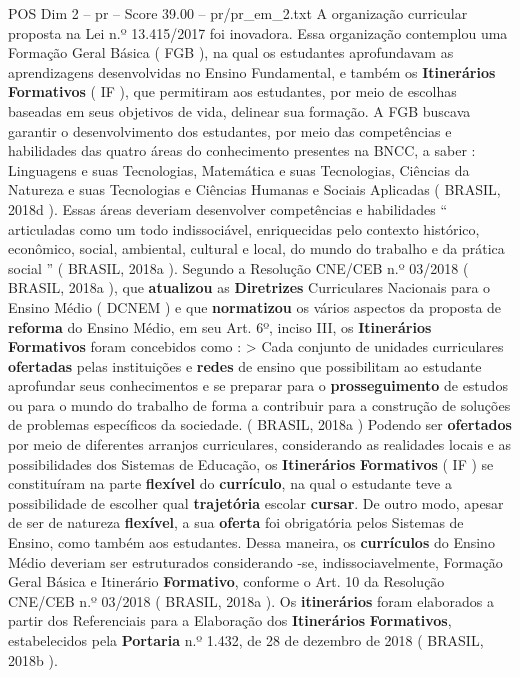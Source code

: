 \begin{textsample}{POS Dim 2 – pr – Score 39.00 – pr/pr\_em\_2.txt}
A organização curricular proposta na Lei n.º 13.415/2017 foi inovadora.
Essa organização contemplou uma Formação Geral Básica ( FGB ), na qual os estudantes aprofundavam as aprendizagens desenvolvidas no Ensino Fundamental, e também os \textbf{Itinerários} \textbf{Formativos} ( IF ), que permitiram aos estudantes, por meio de escolhas baseadas em seus objetivos de vida, delinear sua formação.
A FGB buscava garantir o desenvolvimento dos estudantes, por meio das competências e habilidades das quatro áreas do conhecimento presentes na BNCC, a saber : Linguagens e suas Tecnologias, Matemática e suas Tecnologias, Ciências da Natureza e suas Tecnologias e Ciências Humanas e Sociais Aplicadas ( BRASIL, 2018d ).
Essas áreas deveriam desenvolver competências e habilidades “ articuladas como um todo indissociável, enriquecidas pelo contexto histórico, econômico, social, ambiental, cultural e local, do mundo do trabalho e da prática social ” ( BRASIL, 2018a ).
Segundo a Resolução CNE/CEB n.º 03/2018 ( BRASIL, 2018a ), que \textbf{atualizou} as \textbf{Diretrizes} Curriculares Nacionais para o Ensino Médio ( DCNEM ) e que \textbf{normatizou} os vários aspectos da proposta de \textbf{reforma} do Ensino Médio, em seu Art. 6º, inciso III, os \textbf{Itinerários} \textbf{Formativos} foram concebidos como : > Cada conjunto de unidades curriculares \textbf{ofertadas} pelas instituições e \textbf{redes} de ensino que possibilitam ao estudante aprofundar seus conhecimentos e se preparar para o \textbf{prosseguimento} de estudos ou para o mundo do trabalho de forma a contribuir para a construção de soluções de problemas específicos da sociedade. ( BRASIL, 2018a ) Podendo ser \textbf{ofertados} por meio de diferentes arranjos curriculares, considerando as realidades locais e as possibilidades dos Sistemas de Educação, os \textbf{Itinerários} \textbf{Formativos} ( IF ) se constituíram na parte \textbf{flexível} do \textbf{currículo}, na qual o estudante teve a possibilidade de escolher qual \textbf{trajetória} escolar \textbf{cursar}.
De outro modo, apesar de ser de natureza \textbf{flexível}, a sua \textbf{oferta} foi obrigatória pelos Sistemas de Ensino, como também aos estudantes.
Dessa maneira, os \textbf{currículos} do Ensino Médio deveriam ser estruturados considerando -se, indissociavelmente, Formação Geral Básica e Itinerário \textbf{Formativo}, conforme o Art. 10 da Resolução CNE/CEB n.º 03/2018 ( BRASIL, 2018a ).
Os \textbf{itinerários} foram elaborados a partir dos Referenciais para a Elaboração dos \textbf{Itinerários} \textbf{Formativos}, estabelecidos pela \textbf{Portaria} n.º 1.432, de 28 de dezembro de 2018 ( BRASIL, 2018b ).

\end{textsample}

